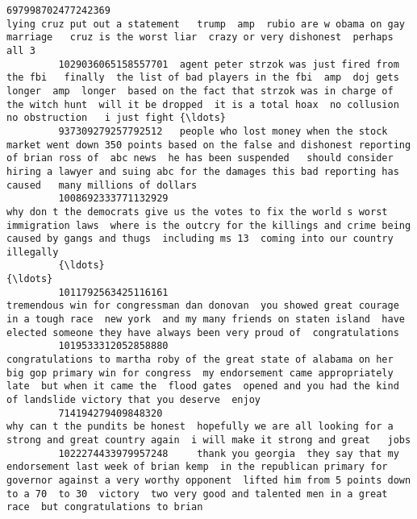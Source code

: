 \documentclass[11pt]{article}
\begin{document}
\begin{Verbatim}[commandchars=\\\{\}]
         697998702477242369                                                                                                                                          lying cruz put out a statement   trump  amp  rubio are w obama on gay marriage   cruz is the worst liar  crazy or very dishonest  perhaps all 3    
         1029036065158557701  agent peter strzok was just fired from the fbi   finally  the list of bad players in the fbi  amp  doj gets longer  amp  longer  based on the fact that strzok was in charge of the witch hunt  will it be dropped  it is a total hoax  no collusion  no obstruction   i just fight {\ldots}   
         937309279257792512   people who lost money when the stock market went down 350 points based on the false and dishonest reporting of brian ross of  abc news  he has been suspended   should consider hiring a lawyer and suing abc for the damages this bad reporting has caused   many millions of dollars    
         1008692333771132929                                                                 why don t the democrats give us the votes to fix the world s worst immigration laws  where is the outcry for the killings and crime being caused by gangs and thugs  including ms 13  coming into our country illegally    
         {\ldots}                                                                                                                                                                                                                                                                                                      {\ldots}   
         1011792563425116161                                                                         tremendous win for congressman dan donovan  you showed great courage in a tough race  new york  and my many friends on staten island  have elected someone they have always been very proud of  congratulations    
         1019533312052858880                               congratulations to martha roby of the great state of alabama on her big gop primary win for congress  my endorsement came appropriately late  but when it came the  flood gates  opened and you had the kind of landslide victory that you deserve  enjoy    
         714194279409848320                                                                                                                                               why can t the pundits be honest  hopefully we are all looking for a strong and great country again  i will make it strong and great   jobs    
         1022274433979957248     thank you georgia  they say that my endorsement last week of brian kemp  in the republican primary for governor against a very worthy opponent  lifted him from 5 points down to a 70  to 30  victory  two very good and talented men in a great race  but congratulations to brian    

\end{Verbatim}
\end{document}
